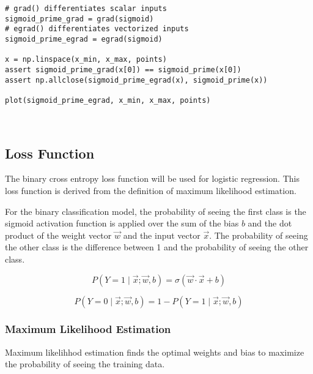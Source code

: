 \documentclass[openany]{book}
\begin{document}
\begin{tcolorbox}
\tiny
\begin{verbatim}
# grad() differentiates scalar inputs
sigmoid_prime_grad = grad(sigmoid)
# egrad() differentiates vectorized inputs
sigmoid_prime_egrad = egrad(sigmoid)

x = np.linspace(x_min, x_max, points)
assert sigmoid_prime_grad(x[0]) == sigmoid_prime(x[0])
assert np.allclose(sigmoid_prime_egrad(x), sigmoid_prime(x))

plot(sigmoid_prime_egrad, x_min, x_max, points)
\end{verbatim}
\end{tcolorbox}

    \begin{center}
    \end{center}
    { \hspace*{\fill} \\}
    
    \subsection{Loss Function}\label{loss-function}

The binary cross entropy loss function will be used for logistic
regression. This loss function is derived from the definition of maximum
likelihood estimation.

For the binary classification model, the probability of seeing the first
class is the sigmoid activation function is applied over the sum of the
bias \(b\) and the dot product of the weight vector \(\vec{w}\) and the
input vector \(\vec{x}\). The probability of seeing the other class is
the difference between 1 and the probability of seeing the other class.

\[ P(Y=1 \mid \vec{x}; \vec{w}, b) = \sigma{(\vec{w} \cdot \vec{x} + b)}
\]

\[ P(Y=0 \mid \vec{x}; \vec{w}, b) = 1 - P(Y=1 \mid \vec{x}; \vec{w}, b)
\]

    \subsubsection{Maximum Likelihood
Estimation}\label{maximum-likelihood-estimation}

Maximum likelihhod estimation finds the optimal weights and bias to
maximize the probability of seeing the training data.
\end{document}
